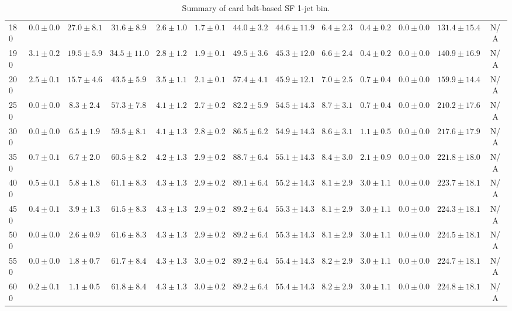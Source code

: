 \begin{table}
{\begin{center}
\begin{tabular}{l | c c | c c c c c c c c  | c c}
180 & $0.0\pm0.0$ & $27.0\pm8.1$ & $31.6\pm8.9$ & $2.6\pm1.0$ & $1.7\pm0.1$ & $44.0\pm3.2$ & $44.6\pm11.9$ & $6.4\pm2.3$ & $0.4\pm0.2$ & $0.0\pm0.0$ & $131.4\pm15.4$ & N/A \\
190 & $3.1\pm0.2$ & $19.5\pm5.9$ & $34.5\pm11.0$ & $2.8\pm1.2$ & $1.9\pm0.1$ & $49.5\pm3.6$ & $45.3\pm12.0$ & $6.6\pm2.4$ & $0.4\pm0.2$ & $0.0\pm0.0$ & $140.9\pm16.9$ & N/A \\
200 & $2.5\pm0.1$ & $15.7\pm4.6$ & $43.5\pm5.9$ & $3.5\pm1.1$ & $2.1\pm0.1$ & $57.4\pm4.1$ & $45.9\pm12.1$ & $7.0\pm2.5$ & $0.7\pm0.4$ & $0.0\pm0.0$ & $159.9\pm14.4$ & N/A \\
250 & $0.0\pm0.0$ & $8.3\pm2.4$ & $57.3\pm7.8$ & $4.1\pm1.2$ & $2.7\pm0.2$ & $82.2\pm5.9$ & $54.5\pm14.3$ & $8.7\pm3.1$ & $0.7\pm0.4$ & $0.0\pm0.0$ & $210.2\pm17.6$ & N/A \\
300 & $0.0\pm0.0$ & $6.5\pm1.9$ & $59.5\pm8.1$ & $4.1\pm1.3$ & $2.8\pm0.2$ & $86.5\pm6.2$ & $54.9\pm14.3$ & $8.6\pm3.1$ & $1.1\pm0.5$ & $0.0\pm0.0$ & $217.6\pm17.9$ & N/A \\
350 & $0.7\pm0.1$ & $6.7\pm2.0$ & $60.5\pm8.2$ & $4.2\pm1.3$ & $2.9\pm0.2$ & $88.7\pm6.4$ & $55.1\pm14.3$ & $8.4\pm3.0$ & $2.1\pm0.9$ & $0.0\pm0.0$ & $221.8\pm18.0$ & N/A \\
400 & $0.5\pm0.1$ & $5.8\pm1.8$ & $61.1\pm8.3$ & $4.3\pm1.3$ & $2.9\pm0.2$ & $89.1\pm6.4$ & $55.2\pm14.3$ & $8.1\pm2.9$ & $3.0\pm1.1$ & $0.0\pm0.0$ & $223.7\pm18.1$ & N/A \\
450 & $0.4\pm0.1$ & $3.9\pm1.3$ & $61.5\pm8.3$ & $4.3\pm1.3$ & $2.9\pm0.2$ & $89.2\pm6.4$ & $55.3\pm14.3$ & $8.1\pm2.9$ & $3.0\pm1.1$ & $0.0\pm0.0$ & $224.3\pm18.1$ & N/A \\
500 & $0.0\pm0.0$ & $2.6\pm0.9$ & $61.6\pm8.3$ & $4.3\pm1.3$ & $2.9\pm0.2$ & $89.2\pm6.4$ & $55.3\pm14.3$ & $8.1\pm2.9$ & $3.0\pm1.1$ & $0.0\pm0.0$ & $224.5\pm18.1$ & N/A \\
550 & $0.0\pm0.0$ & $1.8\pm0.7$ & $61.7\pm8.4$ & $4.3\pm1.3$ & $3.0\pm0.2$ & $89.2\pm6.4$ & $55.4\pm14.3$ & $8.2\pm2.9$ & $3.0\pm1.1$ & $0.0\pm0.0$ & $224.7\pm18.1$ & N/A \\
600 & $0.2\pm0.1$ & $1.1\pm0.5$ & $61.8\pm8.4$ & $4.3\pm1.3$ & $3.0\pm0.2$ & $89.2\pm6.4$ & $55.4\pm14.3$ & $8.2\pm2.9$ & $3.0\pm1.1$ & $0.0\pm0.0$ & $224.8\pm18.1$ & N/A \\
\hline
\end{tabular}
\end{center}
}
\caption{Summary of card bdt-based SF 1-jet bin.}
\end{table}

